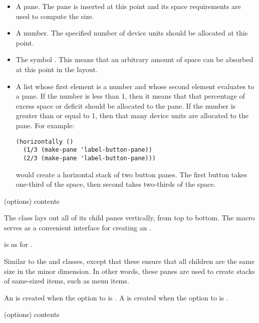 \begin{itemize}
\item A pane.  The pane is inserted at this point and its space requirements are
used to compute the size.

\item A number.  The specified number of device units should be allocated at
this point.

\item The symbol .  This means that an arbitrary amount of space can
be absorbed at this point in the layout.

\item A list whose first element is a number and whose second element evaluates
to a pane.  If the number is less than 1, then it means that that percentage of
excess space or deficit should be allocated to the pane.  If the number is
greater than or equal to 1, then that many device units are allocated to the
pane.  For example:

\begin{verbatim}
(horizontally ()
  (1/3 (make-pane 'label-button-pane))
  (2/3 (make-pane 'label-button-pane)))
\end{verbatim}

would create a horizontal stack of two button panes.  The first button takes
one-third of the space, then second takes two-thirds of the space.
\end{itemize}


 {(\rest options) \body contents}

The  class lays out all of its child panes vertically, from top to
bottom.  The  macro serves as a convenient interface for creating
an .

 is as for .



Similar to the  and  classes, except that these
ensure that all children are the same size in the minor dimension.  In other
words, these panes are used to create stacks of same-sized items, such as menu
items.

An  is created when the  option to
 is .  A  is created when the
 option to  is .


 {(\rest options) \body contents}

